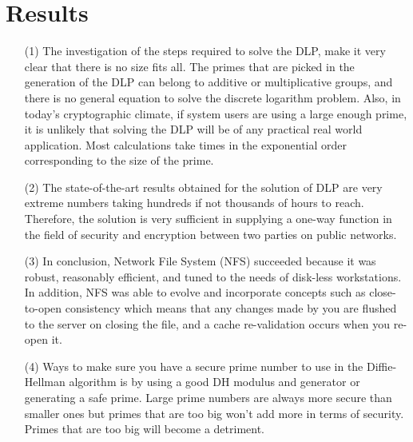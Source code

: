 \documentclass{article}
\begin{document}
\section{Results}
\begin{itemize}
    \item[(1)] The investigation of the steps required to solve the DLP, make it very clear that there is no size fits all. The primes that are picked in the generation of the DLP can belong to additive or multiplicative groups, and there is no general equation to solve the discrete logarithm problem. Also, in today's cryptographic climate, if system users are using a large enough prime, it is unlikely that solving the DLP will be of any practical real world application. Most calculations take times in the exponential order corresponding to the size of the prime. 
    \item[(2)] The state-of-the-art results obtained for the solution of DLP are very extreme numbers taking hundreds if not thousands of hours to reach. Therefore, the solution is very sufficient in supplying a one-way function in the field of security and encryption between two parties on public networks.
    \item[(3)] In conclusion, Network File System (NFS) succeeded because it was robust, reasonably efficient, and tuned to the needs of disk-less workstations. In addition, NFS was able to evolve and incorporate concepts such as close-to-open consistency which means that any changes made by you are flushed to the server on closing the file, and a cache re-validation occurs when you re-open it.
    \item[(4)] Ways to make sure you have a secure prime number to use in the Diffie-Hellman algorithm is by using a good DH modulus and generator or generating a safe prime. Large prime numbers are always more secure than smaller ones but primes that are too big won't add more in terms of security. Primes that are too big will become a detriment.

    
\end{itemize}
\end{document}
